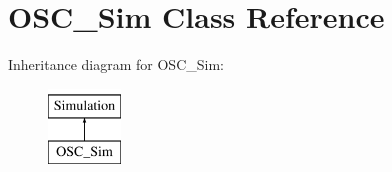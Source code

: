 \hypertarget{class_o_s_c___sim}{}\section{O\+S\+C\+\_\+\+Sim Class Reference}
\label{class_o_s_c___sim}
Inheritance diagram for O\+S\+C\+\_\+\+Sim\+:\begin{figure}[H]
\begin{center}
\leavevmode
\includegraphics[height=2.000000cm]{class_o_s_c___sim}
\end{center}
\end{figure}
